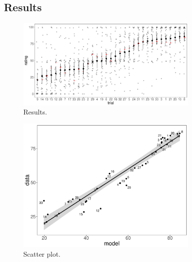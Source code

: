 \documentclass[11pt]{article}
\begin{document}
\afterpage{\clearpage}

\subsection{Results}
\label{sub:results}

\begin{figure}[t]
  \centering
  \includegraphics[width=0.8\textwidth]{exp2_means}
  \caption{Results.}
  \label{fig:exp2_means}
\end{figure}

\begin{figure}[t]
  \centering
  \includegraphics[width=0.8\textwidth]{exp2_scatter}
  \caption{Scatter plot.}
  \label{fig:exp2_scatter}
\end{figure}

\afterpage{\clearpage}


% 
% 
\end{document}
